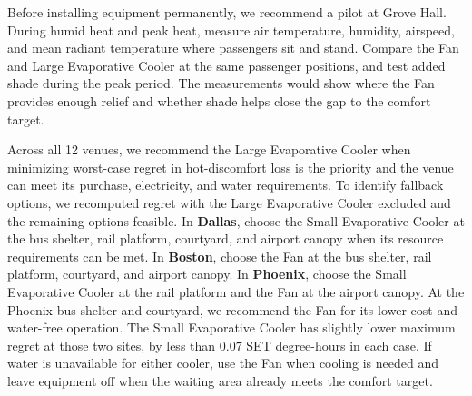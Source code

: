 \indent Before installing equipment permanently, we recommend a pilot at Grove Hall. During humid heat and peak heat, measure air temperature, humidity, airspeed, and mean radiant temperature where passengers sit and stand. Compare the Fan and Large Evaporative Cooler at the same passenger positions, and test added shade during the peak period. The measurements would show where the Fan provides enough relief and whether shade helps close the gap to the comfort target.

\indent Across all 12 venues, we recommend the Large Evaporative Cooler when minimizing worst-case regret in hot-discomfort loss is the priority and the venue can meet its purchase, electricity, and water requirements. To identify fallback options, we recomputed regret with the Large Evaporative Cooler excluded and the remaining options feasible. In \textbf{Dallas}, choose the Small Evaporative Cooler at the bus shelter, rail platform, courtyard, and airport canopy when its resource requirements can be met. In \textbf{Boston}, choose the Fan at the bus shelter, rail platform, courtyard, and airport canopy. In \textbf{Phoenix}, choose the Small Evaporative Cooler at the rail platform and the Fan at the airport canopy. At the Phoenix bus shelter and courtyard, we recommend the Fan for its lower cost and water-free operation. The Small Evaporative Cooler has slightly lower maximum regret at those two sites, by less than $0.07$ SET degree-hours in each case. If water is unavailable for either cooler, use the Fan when cooling is needed and leave equipment off when the waiting area already meets the comfort target.
